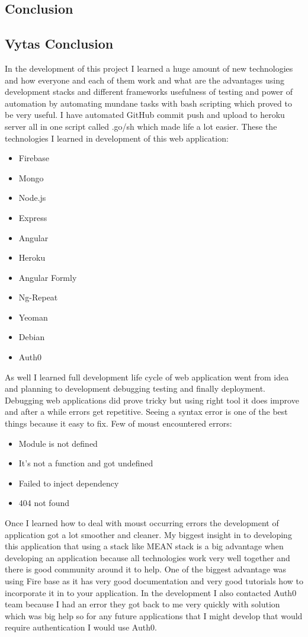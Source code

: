 \begin{itemize}
\chapter{Conclusion}
\section{Vytas Conclusion}
In the development of this project I learned a huge amount of new technologies and how everyone and each of them work and what are the advantages using development stacks and different frameworks usefulness of testing and power of automation by automating mundane tasks with bash scripting which proved to be very useful. I have automated GitHub commit push and upload to heroku server all in one script called .go/sh which made life a lot easier. These the technologies I learned in development of this web application:

\begin{itemize}
	\item Firebase
	\item Mongo
	\item Node.js 
	\item Express
	\item Angular
	\item Heroku
	\item Angular Formly
	\item Ng-Repeat
	\item Yeoman 
	\item Debian
	\item Auth0
\end{itemize}
As well I learned full development life cycle of web application went from idea and planning to development debugging testing and finally deployment. Debugging web applications did prove tricky but using right tool it does improve and after a while errors get repetitive. Seeing a syntax error is one of the best things because it easy to fix. Few of moust encountered errors:
\begin{itemize}
	\item Module is not defined
	\item It’s not a function and got undefined
	\item Failed to inject dependency
	\item 404 not found
\end{itemize}
Once I learned how to deal with moust occurring errors the development of application got a lot smoother and cleaner. My biggest insight in to developing this application that using a stack like MEAN stack is a big advantage when developing an application because all technologies work very well together and there is good community around it to help. One of the biggest advantage was using Fire base as it has very good documentation and very good tutorials how to incorporate it in to your application. In the development I also contacted Auth0 team because I had an error they got back to me very quickly with solution which was big help so for any future applications that I might develop that would require authentication I would
 use Auth0.
 

\end{itemize}
